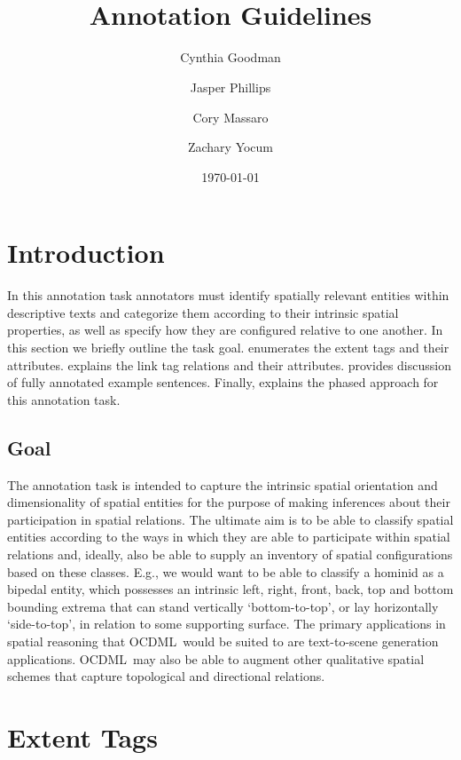 \documentclass[11pt]{article}
\title{\nameML\\
{\Large Annotation Guidelines \version}}
\author{
    Cynthia Goodman\\
    \and
    Jasper Phillips\\
    \and
    Cory Massaro\\
    \and
    Zachary Yocum\\
}
\date{\today}
\newcommand{\ML}{OCDML}
\begin{document}
    
\maketitle

\tableofcontents
\newpage

\section{Introduction} %
\label{sec:introduction}
In this annotation task annotators must identify spatially relevant entities within descriptive texts and categorize them according to their intrinsic spatial properties, as well as specify how they are configured relative to one another. In this section we briefly outline the task goal.  enumerates the extent tags and their attributes.  explains the link tag relations and their attributes.  provides discussion of fully annotated example sentences. Finally,  explains the phased approach for this annotation task.

\subsection{Goal} %
\label{sub:goal}
The annotation task is intended to capture the intrinsic spatial orientation and dimensionality of spatial entities for the purpose of making inferences about their participation in spatial relations. The ultimate aim is to be able to classify spatial entities according to the ways in which they are able to participate within spatial relations and, ideally, also be able to supply an inventory of spatial configurations based on these classes. E.g., we would want to be able to classify a hominid as a bipedal entity, which possesses an intrinsic left, right, front, back, top and bottom bounding extrema that can stand vertically `bottom-to-top', or lay horizontally `side-to-top', in relation to some supporting surface. The primary applications in spatial reasoning that \ML~would be suited to are text-to-scene generation applications. \ML~may also be able to augment other qualitative spatial schemes that capture topological and directional relations.


\section{Extent Tags} %
\label{sec:extent_tags}
\end{document}
